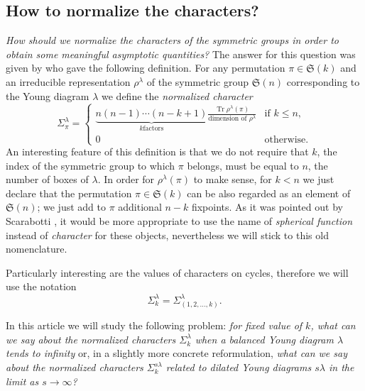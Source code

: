 \documentclass[12pt]{amsart}
\theoremstyle{plain}
\theoremstyle{remark}
\newcommand{\Sym}{\mathfrak{S}}
\DeclareMathOperator{\Tr}{Tr}
\begin{document}
\subsection{How to normalize the characters?}
\emph{How should we normalize the characters of the symmetric groups in order to
obtain some meaningful asymptotic quantities?} 
The answer for this question was given by \cite{Biane2003} who
gave the following definition.
For any permutation $\pi\in \Sym(k)$ and an irreducible representation
$\rho^\lambda$ of the
symmetric group $\Sym(n)$ corresponding to the Young diagram $\lambda$ we
define the \emph{normalized character}
\begin{equation}
\label{eq:character}
 \Sigma^\lambda_\pi =\begin{cases} \underbrace{n(n-1)\cdots (n-k+1)}_{k \text{
factors}} \frac{\Tr \rho^\lambda(\pi)}{\text{dimension of $\rho^\lambda$}} &
\text{if } k\leq n, \\ 0 & \text{otherwise.} \end{cases} 
\end{equation}
An interesting feature of this definition is that we do not require that $k$,
the index of the symmetric group to which $\pi$ belongs, must be equal to $n$,
the number of boxes of $\lambda$. In order for $\rho^\lambda(\pi)$ to make
sense, for $k<n$ we just declare that the permutation $\pi\in\Sym(k)$ can be
also regarded as an element of $\Sym(n)$; we just add to $\pi$ additional $n-k$
fixpoints. As it was pointed out by Scarabotti \cite{Scarabotti2011}, it would
be more appropriate to use the name of \emph{spherical function} instead of
\emph{character} for these objects, nevertheless we will stick to this old
nomenclature.



Particularly interesting are the values of characters on cycles, therefore we
will use the notation
$$ \Sigma^\lambda_k = \Sigma^\lambda_{(1,2,\dots,k)}. $$

In this article we will study the following problem: \emph{for fixed value of
$k$, what
can we say about the normalized characters $\Sigma^{\lambda}_k$ when a balanced
Young diagram $\lambda$ tends to infinity} or, in a slightly more concrete
reformulation, \emph{what can we say about the normalized characters $\Sigma^{s
\lambda}_k$ related to dilated Young diagrams $s\lambda$ in the limit as
$s\to\infty$?}
\end{document}
